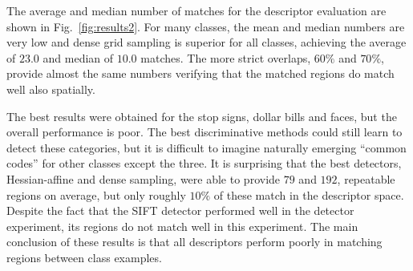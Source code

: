\documentclass[10pt,journal,cspaper,compsoc]{IEEEtran}
\begin{document}
%
The average and median number of matches for the descriptor evaluation
are shown in Fig.~\ref{fig:results2}.
For many classes, the mean and median numbers are very low and
dense grid sampling is superior for
all classes, achieving the average of $23.0$ and median of $10.0$ matches.
The more strict overlaps, $60\%$ and $70\%$, provide almost the same numbers
verifying that the matched regions do match well also spatially.

The best results were obtained for the stop signs, dollar bills and
faces, but the overall performance is poor.
The best discriminative methods could still learn to detect these
categories, but it is difficult to imagine naturally emerging
``common codes'' for other classes except the three.
It is surprising that the best detectors, Hessian-affine and dense
sampling, were able to provide $79$ and $192$, repeatable regions
on average, but only roughly $10\%$ of these match in the descriptor space.
Despite the fact that the SIFT detector performed well in the detector
experiment, its regions do not match well in this experiment.
The main conclusion of these results is that all descriptors perform
poorly in matching regions between class examples.
\end{document}
